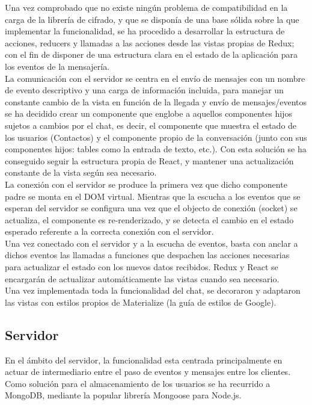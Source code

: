 Una vez comprobado que no existe ningún problema de compatibilidad en la carga de la librería de cifrado, y que se disponía de una base sólida sobre la que implementar la funcionalidad, se ha procedido a desarrollar la estructura de acciones, reducers y llamadas a las acciones desde las vistas propias de Redux; con el fin de disponer de una estructura clara en el estado de la aplicación para los eventos de la mensajería. \\

La comunicación con el servidor se centra en el envío de mensajes con un nombre de evento descriptivo y una carga de información incluida, para manejar un constante cambio de la vista en función de la llegada y envío de mensajes/eventos se ha decidido crear un componente que englobe a aquellos componentes hijos sujetos a cambios por el chat, es decir, el componente que muestra el estado de los usuarios (Contactos) y el componente propio de la conversación (junto con sus componentes hijos: tables como la entrada de texto, etc.). Con esta solución se ha conseguido seguir la estructura propia de React, y mantener una actualización constante de la vista según sea necesario. \\

La conexión con el servidor se produce la primera vez que dicho componente padre se monta en el DOM virtual. Mientras que la escucha a los eventos que se esperan del servidor se configura una vez que el objecto de conexión (socket) se actualiza, el componente es re-renderizado, y se detecta el cambio en el estado esperado referente a la correcta conexión con el servidor. \\

Una vez conectado con el servidor y a la escucha de eventos, basta con anclar a dichos eventos las llamadas a funciones que despachen las acciones necesarias para actualizar el estado con los nuevos datos recibidos. Redux y React se encargarán de actualizar automáticamente las vistas cuando sea necesario. \\

Una vez implementada toda la funcionalidad del chat, se decoraron y adaptaron las vistas con estilos propios de Materialize (la guía de estilos de Google). \\


\subsection{Servidor}

En el ámbito del servidor, la funcionalidad esta centrada principalmente en actuar de intermediario entre el paso de eventos y mensajes entre los clientes. \\ 

Como solución para el almacenamiento de los usuarios se ha recurrido a MongoDB, mediante la popular librería Mongoose para Node.js. \\
